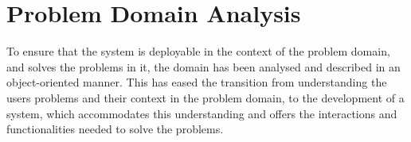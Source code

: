 \chapter{Problem Domain Analysis}\label{ch:problemdomain}
To ensure that the system is deployable in the context of the problem domain, and solves the problems in it, the domain has been analysed and described in an object-oriented manner. This has eased the transition from understanding the users problems and their context in the problem domain, to the development of a system, which accommodates this understanding and offers the interactions and functionalities needed to solve the problems.
